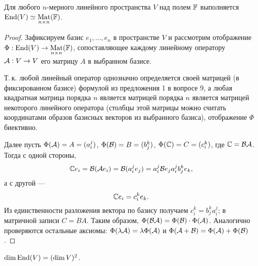 \begin{theorem}
    Для любого $n$-мерного линейного пространства $V$ над полем $\mathbb{F}$ выполняется $\operatorname{End}(V) \simeq \underset{n \times n}{\operatorname{Mat}}(\mathbb{F})$.
\end{theorem}

\begin{proof}
    Зафиксируем базис $e_1, \ldots, e_n$ в пространстве $V$ и рассмотрим отображение $\Phi: \operatorname{End}(V) \to \underset{n \times n}{\operatorname{Mat}}(\mathbb{F})$, сопоставляющее каждому линейному оператору $\mathcal{A}: V \to V$ его матрицу $A$ в выбранном базисе.

    Т.\,к. любой линейный оператор однозначно определяется своей матрицей (в фиксированном базисе) формулой из предложения 1 в вопросе 9, а любая квадратная матрица порядка $n$ является матрицей порядка $n$ является матрицей некоторого линейного оператора (столбцы этой матрицы можно считать координатами образов базисных векторов из выбранного базиса), отображение $\Phi$ биективно.

    Далее пусть $\Phi(\mathcal{A}) = A = (a^j_i)$, $\Phi(\mathcal{B}) = B = (b^k_j)$, $\Phi(\C) = C = (c^k_i)$, где $\C = \B\A$. Тогда с одной стороны,
    \[
        \C e_i = \B(\A e_i) = \B(a^j_ie_j) = a^j_i\B e_j a^j_ib^k_je_k,
    \]
    а с другой ---
    \[
        \C e_i = c^k_ie_k.
    \]
    Из единственности разложения вектора по базису получаем $c^k_i = b^k_ja^j_i$; в матричной записи $C = BA$. Таким образом, $\Phi(\mathcal{B}\mathcal{A}) = \Phi(\mathcal{B}) \cdot \Phi(\mathcal{A})$. Аналогично проверяются остальные аксиомы: $\Phi(\lambda\mathcal{A}) = \lambda\Phi(\mathcal{A})$ и $\Phi(\mathcal{A} + \mathcal{B}) = \Phi(\mathcal{A}) + \Phi(\mathcal{B})$.
\end{proof}

\begin{corollary}
    $\dim\operatorname{End}(V) = (\dim V)^2$.
\end{corollary}

\renewcommand{\C}{\mathbb{C}}

